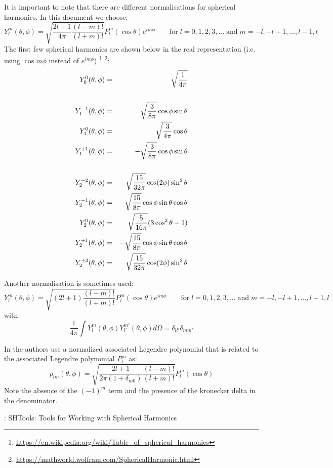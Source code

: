 It is important to note that there are different normalisations for spherical harmonics.
In this document we choose:
\begin{equation}
Y_l^m(\theta,\phi) = \sqrt{\frac{2l+1}{4\pi} \frac{(l-m)!}{(l+m)!}} P_l^m(\cos\theta) e^{im\phi}
\qquad 
\textrm{for} \; l=0,1,2,3,... \; \textrm{and} \; m=-l,-l+1,...,l-1,l
\label{eq:spha6}
\end{equation}
The first few spherical harmonics are shown below in the real representation (i.e. using $\cos m\phi$  instead of $e^{i m \phi}$) \footnote{\url{https://en.wikipedia.org/wiki/Table_of_spherical_harmonics}} \footnote{\url{https://mathworld.wolfram.com/SphericalHarmonic.html}}:
\begin{eqnarray}
Y_0^0(\theta,\phi)    &=& \sqrt{\frac{1}{4\pi}} \nonumber\\ \nonumber\\
Y_1^{-1}(\theta,\phi) &=& \sqrt{\frac{3}{8\pi}} \cos\phi\sin\theta\nonumber\\
Y_1^{0 }(\theta,\phi) &=& \sqrt{\frac{3}{4\pi}} \cos\theta \nonumber\\
Y_1^{+1}(\theta,\phi) &=& -\sqrt{\frac{3}{8\pi}} \cos\phi\sin\theta \nonumber\\ \nonumber\\
Y_2^{-2}(\theta,\phi) &=& \sqrt{\frac{15}{32\pi}} \cos(2\phi) \sin^2\theta \nonumber\\ 
Y_2^{-1}(\theta,\phi) &=& \sqrt{\frac{15}{8\pi}} \cos\phi \sin\theta\cos\theta \nonumber\\ 
Y_2^{ 0}(\theta,\phi) &=& \sqrt{\frac{5}{16\pi}} (3\cos^2\theta -1) \nonumber\\
Y_2^{+1}(\theta,\phi) &=& -\sqrt{\frac{15}{8\pi}} \cos\phi \sin\theta\cos\theta \nonumber\\
Y_2^{+2}(\theta,\phi) &=& \sqrt{\frac{15}{32\pi}} \cos(2\phi) \sin^2\theta \nonumber
\end{eqnarray}


Another normalisation is sometimes used:  
\begin{equation}
Y_l^m(\theta,\phi) = \sqrt{(2l+1) \frac{(l-m)!}{(l+m)!}} P_l^m(\cos\theta) e^{im\phi}
\qquad 
\textrm{for} \; l=0,1,2,3,... \; \textrm{and} \; m=-l,-l+1,...,l-1,l
\label{eq:spha6}
\end{equation}
with
\[
\frac{1}{4\pi}
\int Y_l^m(\theta,\phi) Y_{l'}^{m'}(\theta,\phi) d\Omega = \delta_{ll'} \delta_{mm'}
\]





\begin{remark}
In \cite{zhmt08} the authors use a normalized associated Legendre
polynomial that is related to the associated Legendre polynomial $P_l^m$ as:
\[
p_{lm}(\theta,\phi) = \sqrt{\frac{2l+1}{2\pi(1+\delta_{m0})} \frac{(l-m)!}{(l+m)!}} P_l^m(\cos\theta)
\]
Note the absence of the $(-1)^m$ term and the presence of the kronecker delta in the denominator.
\end{remark}



\Literature: SHTools: Tools for Working with Spherical Harmonics \cite{wime18}
